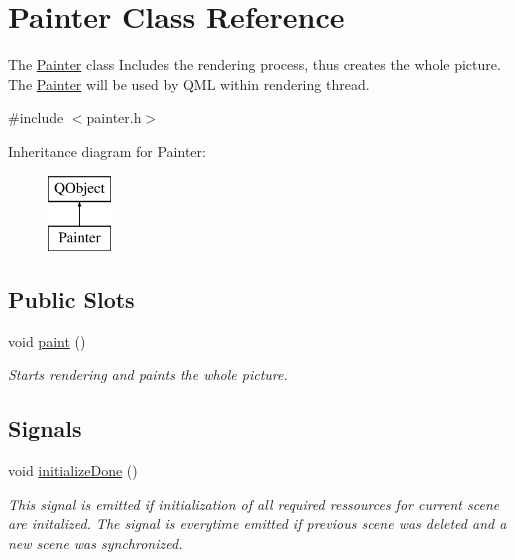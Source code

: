 \hypertarget{class_painter}{}\section{Painter Class Reference}
\label{class_painter}


The \hyperlink{class_painter}{Painter} class  Includes the rendering process, thus creates the whole picture. The \hyperlink{class_painter}{Painter} will be used by Q\+M\+L within rendering thread.  




{\ttfamily \#include $<$painter.\+h$>$}

Inheritance diagram for Painter\+:\begin{figure}[H]
\begin{center}
\leavevmode
\includegraphics[height=2.000000cm]{class_painter}
\end{center}
\end{figure}
\subsection*{Public Slots}
\begin{DoxyCompactItemize}
\item 
void \hyperlink{class_painter_a5b9b4ed8aebaebeb2f6483e350445fbc}{paint} ()
\begin{DoxyCompactList}\small\item\em Starts rendering and paints the whole picture. \end{DoxyCompactList}\end{DoxyCompactItemize}
\subsection*{Signals}
\begin{DoxyCompactItemize}
\item 
void \hyperlink{class_painter_a171dd523e7ba423b8da554a062168e94}{initialize\+Done} ()
\begin{DoxyCompactList}\small\item\em This signal is emitted if initialization of all required ressources for current scene are initalized.  The signal is everytime emitted if previous scene was deleted and a new scene was synchronized. \end{DoxyCompactList}\end{DoxyCompactItemize}

